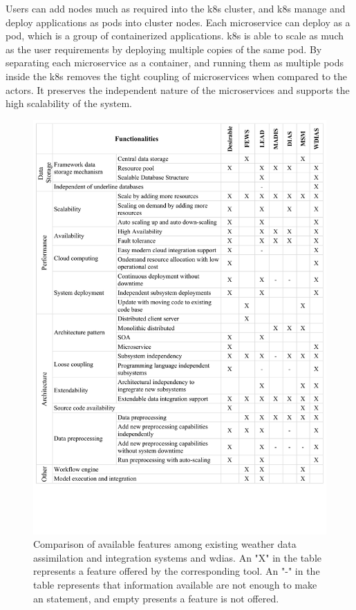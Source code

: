 Users can add nodes much as required into the \acrshort{k8s} cluster, and \acrshort{k8s} manage and deploy applications as pods into cluster nodes. Each microservice can deploy as a pod, which is a group of containerized applications. \acrshort{k8s} is able to scale as much as the user requirements by deploying multiple copies of the same pod. By separating each microservice as a container, and running them as multiple pods inside the \acrshort{k8s} removes the tight coupling of microservices when compared to the actors. It preserves the independent nature of the microservices and supports the high scalability of the system.


\begin{figure}[htp]
    \centering
    \includegraphics[width=1.05\textwidth]{method/misc/architecture_comparison_pros_cons.pdf}
    \caption{Comparison of available features among existing weather data assimilation and integration systems and \acrshort{wdias}. An "X" in the table represents a feature offered by the corresponding tool. An "-" in the table represents that information available are not enough to make an statement, and empty presents a feature is not offered. }
    \label{fi:architecture_comparison}
\end{figure}

